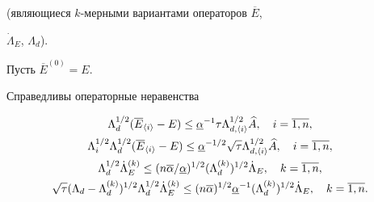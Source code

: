 (являющиеся $k$-мерными вариантами операторов $\overline E$, 


$\Dot\Lambda_E$, $\Lambda_d$).


Пусть $\overline E^{(0)}=E$.





\begin{lem} Справедливы операторные неравенства


\begin{gather}


\Lambda_d^{1/2}(\overline E_{\langle i\rangle}-E)\le \underline\alpha^{-1}\tau


\Lambda_{d,\langle i\rangle}^{1/2}\aaa,\quad i=\overline{1,n},\\


%


\Lambda^{1/2}_i\Lambda_d^{1/2}(\overline E_{\langle i\rangle}-E)\le


\underline\alpha^{-1/2}\sqrt{\tau}\Lambda_{d,\langle i\rangle}^{1/2}\aaa,


\quad i=\overline{1,n},\\


%


\Lambda_d^{1/2}\Dot\Lambda_E^{(k)}\le(n\overline\alpha/


\underline\alpha)^{1/2}(\Lambda_d^{(k)})^{1/2}\Dot\Lambda_E,\quad


k=\overline{1,n},\\


%


\sqrt\tau(\Lambda_d-\Lambda_d^{(k)})^{1/2}


\Lambda_d^{1/2}\Dot\Lambda_E^{(k)}\le(n\overline\alpha)^{1/2}


\underline\alpha^{-1}(\Lambda_d^{(k)})^{1/2}\Dot\Lambda_E,\quad


k=\overline{1,n}.


\end{gather}


\end{lem}





